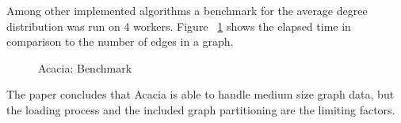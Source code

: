 \documentclass{sig-alternate}
\begin{document}
Among other implemented algorithms a benchmark for the average degree distribution was run on 4 workers.
Figure ~\ref{fig:distgraphperf} shows the elapsed time in comparison to the number of edges in a graph.

\begin{figure}[H]
\centering
{}
\caption{Acacia: Benchmark \cite{dayarathna2014towards}}
\label{fig:distgraphperf}
\end{figure}

The paper concludes that Acacia is able to handle medium size graph data, but the loading process and 
the included graph partitioning are the limiting factors.




%

%
%
\end{document}
